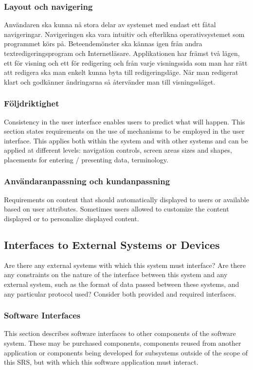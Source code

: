 \subsubsection{Layout och navigering}
Användaren ska kunna nå stora delar av systemet med endast ett fåtal navigeringar. Navigeringen ska vara intuitiv och efterlikna operativsystemet som programmet körs på. Beteendemönster ska kännas igen från andra textredigeringsprogram och Internetläsare. Applikationen har främst två lägen, ett för visning och ett för redigering och från varje visningssida som man har rätt att redigera ska man enkelt kunna byta till redigeringsläge. När man redigerat klart och godkänner ändringarna så återvänder man till visningssläget.

\subsubsection{Följdriktighet} %
Consistency in the user interface enables users to predict what will happen. This section states requirements on the use of mechanisms to be employed in the user interface. This applies both within the system and with other systems and can be applied at different levels: navigation controls, screen areas sizes and shapes, placements for entering / presenting data, terminology.

\subsubsection{Användaranpassning och kundanpassning}
Requirements on content that should automatically displayed to users or available based on user attributes. Sometimes users allowed to customize the content displayed or to personalize displayed content.

\subsection{Interfaces to External Systems or Devices}
Are there any external systems with which this system must interface? Are there any constraints on the nature of the interface between this system and any external system, such as the format of data passed between these systems, and any particular protocol used? Consider both provided and required interfaces.

\subsubsection{Software Interfaces}
This section describes software interfaces to other components of the software system. These may be purchased components, components reused from another application or components being developed for subsystems outside of the scope of this SRS, but with which this software application must interact.


